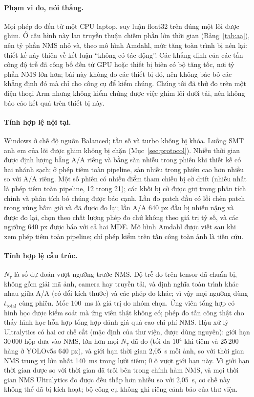 \documentclass[12pt,a4paper]{article}
\newcommand{\Ntau}{N_{\tau}}
\begin{document}
\paragraph{Phạm vi đo, nói thẳng.}
Mọi phép đo đến từ một CPU laptop, suy luận float32 trên đúng một lõi được ghim. Ở cấu hình này lan truyền thuận chiếm phần lớn thời gian (Bảng~\ref{tab:aa}), nên tỷ phần NMS nhỏ và, theo mô hình Amdahl, mức tăng toàn trình bị nén lại: thiết kế này thiên về kết luận ``không có tác động''. Các khẳng định của các tấn công độ trễ đã công bố đến từ GPU hoặc thiết bị biên có bộ tăng tốc, nơi tỷ phần NMS lớn hơn; bài này không đo các thiết bị đó, nên không bác bỏ các khẳng định đó mà chỉ cho công cụ để kiểm chúng. Chúng tôi đã thử đo trên một điện thoại Arm nhưng không kiểm chứng được việc ghim lõi dưới tải, nên không báo cáo kết quả trên thiết bị này.
\paragraph{Tính hợp lệ nội tại.}
Windows ở chế độ nguồn Balanced; tần số và turbo không bị khóa. Luồng SMT anh em của lõi được ghim không bị chặn (Mục~\ref{sec:protocol}). Nhiễu thời gian được định lượng bằng A/A riêng và bằng sàn nhiễu trong phiên khi thiết kế có hai nhánh sạch; ở phép tiêm toàn pipeline, sàn nhiễu trong phiên cao hơn nhiều so với A/A riêng. Một số phiên có nhiều điểm tham chiếu bị cờ drift (nhiều nhất là phép tiêm toàn pipeline, 12 trong 21); các khối bị cờ được giữ trong phân tích chính và phân tích bỏ chúng được báo cạnh. Lần đo patch đầu có lỗi chèn patch trong vùng bấm giờ và đã được đo lại; lần A/A 640 px đầu bị nhiễu nặng và được đo lại, chọn theo chất lượng phép đo chứ không theo giá trị tỷ số, và các ngưỡng 640 px được báo với cả hai MDE. Mô hình Amdahl được viết sau khi xem phép tiêm toàn pipeline; chỉ phép kiểm trên tấn công toàn ảnh là tiến cứu.
\paragraph{Tính hợp lệ cấu trúc.}
$\Ntau$ là số dự đoán vượt ngưỡng trước NMS. Độ trễ đo trên tensor đã chuẩn bị, không gồm giải mã ảnh, camera hay truyền tải, và định nghĩa toàn trình khác nhau giữa A/A (có đổi kích thước) và các phép đo khác; vì vậy mọi ngưỡng dùng $t_{\mathrm{total}}$ cùng phiên. Mốc 100~ms là giá trị do nhóm chọn. Ứng viên tổng hợp có hình học được kiểm soát mà ứng viên thật không có; phép đo tấn công thật cho thấy hình học hỗn hợp tổng hợp đánh giá quá cao chi phí NMS. Hậu xử lý Ultralytics có hai cơ chế cắt (mặc định của thư viện, được dùng nguyên): giới hạn 30\,000 hộp đưa vào NMS, lớn hơn mọi $\Ntau$ đã đo (tối đa $10^4$ khi tiêm và 25\,200 hàng ở YOLOv5s 640 px), và giới hạn thời gian 2,05~s mỗi ảnh, so với thời gian NMS trung vị lớn nhất 140~ms trong lưới tiêm; 0 ô vượt giới hạn này. Vì giới hạn thời gian được so với thời gian đã trôi bên trong chính hàm NMS, và mọi thời gian NMS Ultralytics đo được đều thấp hơn nhiều so với 2,05~s, cơ chế này không thể đã bị kích hoạt; bộ công cụ không ghi riêng cảnh báo của thư viện.
\end{document}
